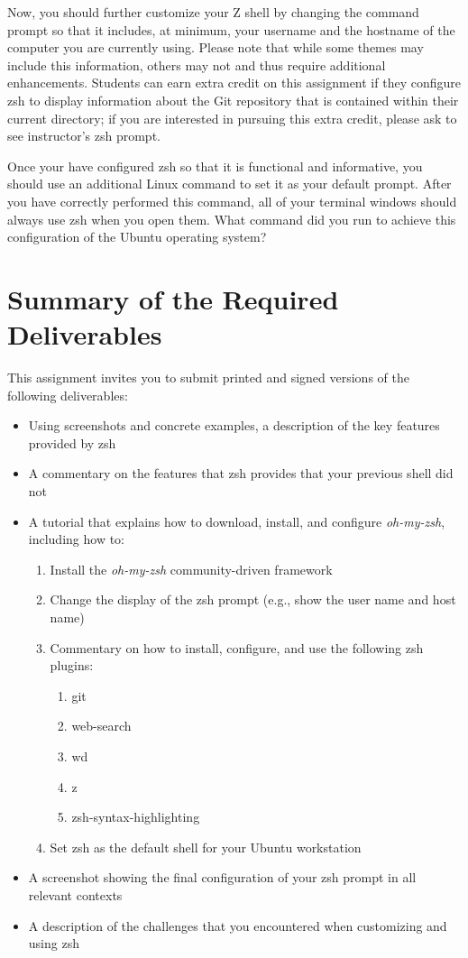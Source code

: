 Now, you should further customize your Z shell by changing the command prompt so that it
includes, at minimum, your username and the hostname of the computer you are currently using.
Please note that while some themes may include this information, others may not and thus require
additional enhancements. Students can earn extra credit on this assignment if they configure zsh
to display information about the Git repository that is contained within their current directory; if
you are interested in pursuing this extra credit, please ask to see instructor’s zsh prompt.


Once your have configured zsh so that it is functional and informative, you should use an
additional Linux command to set it as your default prompt. After you have correctly performed
this command, all of your terminal windows should always use zsh when you open them. What
command did you run to achieve this configuration of the Ubuntu operating system?

\color{red}
\section{Summary of the Required Deliverables}

This assignment invites you to submit printed and signed versions of the following deliverables:
\begin{itemize}
  \item Using screenshots and concrete examples, a description of the key features provided by zsh
  \item A commentary on the features that zsh provides that your previous shell did not
  \item A tutorial that explains how to download, install, and configure \emph{oh-my-zsh}, including how to:
  \begin{enumerate}
    \item Install the \emph{oh-my-zsh} community-driven framework
    \item Change the display of the zsh prompt (e.g., show the user name and host name)
    \item Commentary on how to install, configure, and use the following zsh plugins:

	  \begin{enumerate}
	    \item git
	    \item web-search
	    \item wd
	    \item z
	    \item zsh-syntax-highlighting
	  \end{enumerate}


    \item Set zsh as the default shell for your Ubuntu workstation
  \end{enumerate}
  \item A screenshot showing the final configuration of your zsh prompt in all relevant contexts
  \item A description of the challenges that you encountered when customizing and using zsh
\end{itemize}
\color{black}

